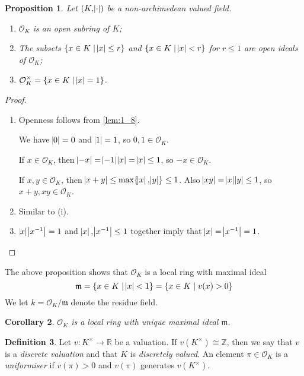 \documentclass[11pt]{article}
\theoremstyle{definition}
\newtheorem{definition}{Definition}[subsection]
\theoremstyle{plain}
\newtheorem{proposition}[definition]{Proposition}
\newtheorem{corollary}[definition]{Corollary}
\theoremstyle{remark}
\newcommand{\ZZ}{\mathbb{Z}}
\newcommand{\RR}{\mathbb{R}}
\newcommand{\cO}{\mathcal{O}}
\newcommand{\fm}{\mathfrak{m}}
\begin{document}
\begin{proposition}\label{prop:2_3}
    Let $(K, \abs{\cdot})$ be a non-archimedean valued field.
    \begin{enumerate}
        \item $\cO_K$ is an open subring of $K$;
        \item The subsets $\{x \in K \mid \abs{x} \le r\}$ and $\{x \in K \mid \abs{x} < r\}$ for $r \le 1$ are open ideals of $\cO_K$;
        \item $\cO_K^\times = \{x \in K \mid \abs{x} = 1\}$.
    \end{enumerate}
\end{proposition}
\begin{proof}\phantom{}
    \begin{enumerate}
        \item Openness follows from \autoref{lem:1_8}.

            \noindent We have $\abs{0} = 0$ and $\abs{1} = 1$, so $0, 1 \in \cO_K$.

            \noindent If $x \in \cO_K$, then $\abs{-x} = \abs{-1}\abs{x} = \abs{x} \le 1$, so $-x \in \cO_K$.

            \noindent If $x, y \in \cO_K$, then $\abs{x + y} \le \max \{\abs{x}, \abs{y}\} \le 1$. Also $\abs{x y} = \abs{x} \abs{y} \le 1$, so $x + y, x y \in \cO_K$.

        \item Similar to (i).

        \item $\abs{x} \abs{x^{-1}} = 1$ and $\abs{x}, \abs{x^{-1}} \le 1$ together imply that $\abs{x} = \abs{x^{-1}} = 1$. \qedhere
    \end{enumerate}
\end{proof}

\noindent The above proposition shows that $\cO_K$ is a local ring with maximal ideal
\begin{equation*}
    \fm = \{x \in K \mid \abs{x} < 1\} = \{x \in K \mid v(x) > 0\}
\end{equation*}
We let $k = \cO_K / \fm$ denote the residue field.

\begin{corollary}\label{cor:2_4}
    $\cO_K$ is a local ring with unique maximal ideal $\fm$.
\end{corollary}

\begin{definition}\label{def:2_5}
    Let $v : K^\times \to \RR$ be a valuation. If $v(K^\times) \cong \ZZ$, then we say that $v$ is a \emph{discrete valuation} and that $K$ is \emph{discretely valued}. An element $\pi \in \cO_K$ is a \emph{uniformiser} if $v(\pi) > 0$ and $v(\pi)$ generates $v(K^\times)$.
\end{definition}
\end{document}
